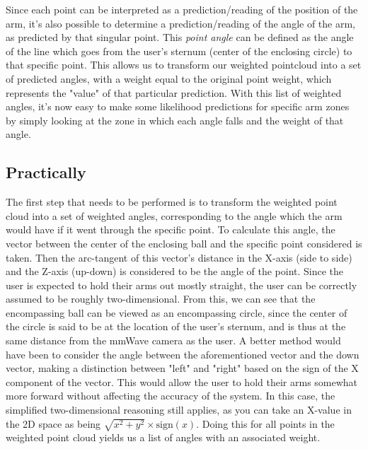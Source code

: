 Since each point can be interpreted as a prediction/reading of the position of the arm, it's also possible to determine a prediction/reading of the angle of the arm, as predicted by that singular point.
This \textit{point angle} can be defined as the angle of the line which goes from the user's sternum (center of the enclosing circle) to that specific point.
This allows us to transform our weighted pointcloud into a set of predicted angles, with a weight equal to the original point weight, which represents the "value" of that particular prediction.
With this list of weighted angles, it's now easy to make some likelihood predictions for specific arm zones by simply looking at the zone in which each angle falls and the weight of that angle.


\subsection{Practically}
\label{sub-section: tracking method - data interpretation - practically}

The first step that needs to be performed is to transform the weighted point cloud into a set of weighted angles, corresponding to the angle which the arm would have if it went through the specific point.
To calculate this angle, the vector between the center of the enclosing ball and the specific point considered is taken.
Then the arc-tangent of this vector's distance in the X-axis (side to side) and the Z-axis (up-down) is considered to be the angle of the point.
Since the user is expected to hold their arms out mostly straight, the user can be correctly assumed to be roughly two-dimensional.
From this, we can see that the encompassing ball can be viewed as an encompassing circle, since the center of the circle is said to be at the location of the user's sternum, and is thus at the same distance from the mmWave camera as the user.
A better method would have been to consider the angle between the aforementioned vector and the down vector, making a distinction between "left" and "right" based on the sign of the X component of the vector.
This would allow the user to hold their arms somewhat more forward without affecting the accuracy of the system.
In this case, the simplified two-dimensional reasoning still applies, as you can take an X-value in the 2D space as being $\sqrt{x^2 + y^2} \times \text{sign}(x)$.
Doing this for all points in the weighted point cloud yields us a list of angles with an associated weight.

